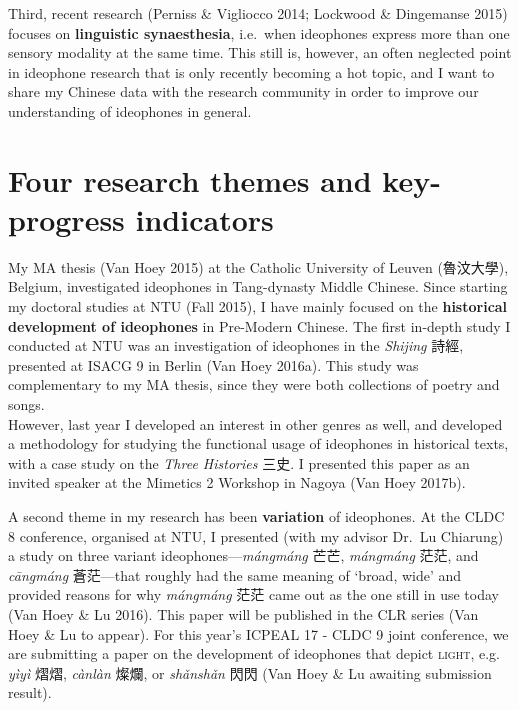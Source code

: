 \documentclass[12pt,]{article}
\theoremstyle{definition}
\theoremstyle{definition}
\theoremstyle{definition}
\theoremstyle{remark}
\begin{document}
Third, recent research (Perniss \& Vigliocco 2014; Lockwood \&
Dingemanse 2015) focuses on \textbf{linguistic synaesthesia}, i.e.~when
ideophones express more than one sensory modality at the same time. This
still is, however, an often neglected point in ideophone research that
is only recently becoming a hot topic, and I want to share my Chinese
data with the research community in order to improve our understanding
of ideophones in general.

\section{Four research themes and key-progress
indicators}\label{four-research-themes-and-key-progress-indicators}

My MA thesis (Van Hoey 2015) at the Catholic University of Leuven
(魯汶大學), Belgium, investigated ideophones in Tang-dynasty Middle
Chinese. Since starting my doctoral studies at NTU (Fall 2015), I have
mainly focused on the \textbf{historical development of ideophones} in
Pre-Modern Chinese. The first in-depth study I conducted at NTU was an
investigation of ideophones in the \emph{Shijing} 詩經, presented at
ISACG 9 in Berlin (Van Hoey 2016a). This study was complementary to my
MA thesis, since they were both collections of poetry and songs.\\
However, last year I developed an interest in other genres as well, and
developed a methodology for studying the functional usage of ideophones
in historical texts, with a case study on the \emph{Three Histories}
三史. I presented this paper as an invited speaker at the Mimetics 2
Workshop in Nagoya (Van Hoey 2017b).

A second theme in my research has been \textbf{variation} of ideophones.
At the CLDC 8 conference, organised at NTU, I presented (with my advisor
Dr.~Lu Chiarung) a study on three variant ideophones---\emph{mángmáng}
芒芒, \emph{mángmáng} 茫茫, and \emph{cāngmáng} 蒼茫---that roughly had
the same meaning of `broad, wide' and provided reasons for why
\emph{mángmáng} 茫茫 came out as the one still in use today (Van Hoey \&
Lu 2016). This paper will be published in the CLR series (Van Hoey \& Lu
to appear). For this year's ICPEAL 17 - CLDC 9 joint conference, we are
submitting a paper on the development of ideophones that depict
\textsc{light}, e.g. \emph{yìyì} 熠熠, \emph{cànlàn} 燦爛, or
\emph{shǎnshǎn} 閃閃 (Van Hoey \& Lu awaiting submission result).
\end{document}

